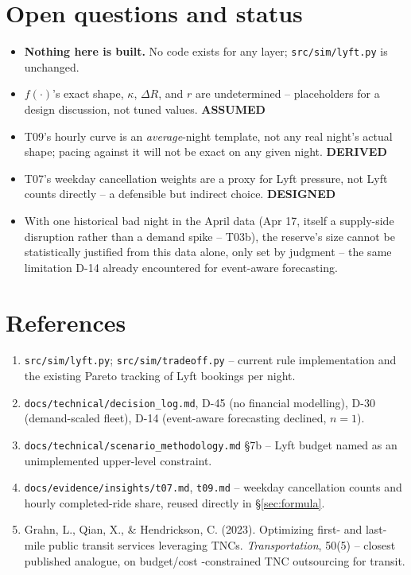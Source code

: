 \documentclass[11pt]{article}
\newcommand{\lab}[1]{{\footnotesize\textsf{\textbf{#1}}}}
\newcommand{\DER}{\lab{DERIVED}}
\newcommand{\ASM}{\lab{ASSUMED}}
\newcommand{\DES}{\lab{DESIGNED}}
\begin{document}
\section{Open questions and status}
\label{sec:open}

\begin{itemize}
  \item \textbf{Nothing here is built.} No code exists for any layer; \texttt{src/sim/lyft.py} is unchanged.
  \item $f(\cdot)$'s exact shape, $\kappa$, $\Delta R$, and $r$ are undetermined -- placeholders for a design
    discussion, not tuned values. \ASM
  \item T09's hourly curve is an \emph{average}-night template, not any real night's actual shape; pacing
    against it will not be exact on any given night. \DER
  \item T07's weekday cancellation weights are a proxy for Lyft pressure, not Lyft counts directly -- a
    defensible but indirect choice. \DES
  \item With one historical bad night in the April data (Apr 17, itself a supply-side disruption rather than
    a demand spike -- T03b), the reserve's size cannot be statistically justified from this data alone, only
    set by judgment -- the same limitation D-14 already encountered for event-aware forecasting.
\end{itemize}

\section*{References}
\begin{enumerate}
  \item \texttt{src/sim/lyft.py}; \texttt{src/sim/tradeoff.py} -- current rule implementation and the existing
    Pareto tracking of Lyft bookings per night.
  \item \texttt{docs/technical/decision\_log.md}, D-45 (no financial modelling), D-30 (demand-scaled fleet),
    D-14 (event-aware forecasting declined, $n=1$).
  \item \texttt{docs/technical/scenario\_methodology.md} \S7b -- Lyft budget named as an unimplemented
    upper-level constraint.
  \item \texttt{docs/evidence/insights/t07.md}, \texttt{t09.md} -- weekday cancellation counts and hourly
    completed-ride share, reused directly in \S\ref{sec:formula}.
  \item Grahn, L., Qian, X., \& Hendrickson, C. (2023). Optimizing first- and last-mile public transit
    services leveraging TNCs. \emph{Transportation}, 50(5) -- closest published analogue, on budget/cost
    -constrained TNC outsourcing for transit.
\end{enumerate}
\end{document}
